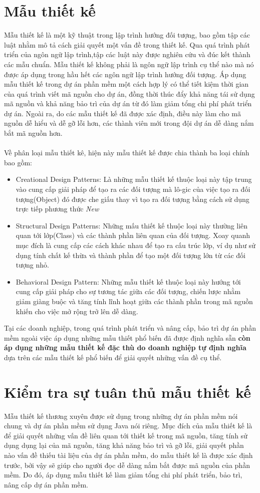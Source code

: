 \documentclass[12pt]{report}
\begin{document}
\section{Mẫu thiết kế}
Mẫu thiết kế là một kỹ thuật trong lập trình hướng đối tượng, bao gồm tập các luật nhằm mô tả cách giải quyết một vấn đề trong thiết kế. Qua quá trình phát triển của ngôn ngữ lập trình,tập các luật này được nghiên cứu và đúc kết thành các mẫu chuẩn. Mẫu thiết kế không phải là ngôn ngữ lập trình cụ thể nào mà nó được áp dụng trong hầu hết các ngôn ngữ lập trình hướng đối tượng.
Áp dụng mẫu thiết kế trong dự án phần mềm một cách hợp lý có thể tiết kiệm thời gian của quá trình viết mã nguồn cho dự án, đồng thời thúc đẩy khả năng tái sử dụng mã nguồn và khả năng bảo trì của dự án từ đó làm giảm tổng chi phí phát triển dự án. Ngoài ra, do các mẫu thiết kế đã được xác định, điều này làm cho mã nguồn dễ hiểu và dễ gỡ lỗi hơn, các thành viên mới trong đội dự án dễ dàng nắm bắt mã nguồn hơn.
 \\\\
Về phân loại mẫu thiết kê, hiện này mẫu thiết kế được chia thành ba loại chính bao gồm:
\begin{itemize}
	\item Creational Design Patterns: Là những mẫu thiết kế thuộc loại này tập trung vào cung cấp giải pháp để tạo ra các đối tượng mà lô-gic của việc tạo ra đối tượng(Object) đó được che giấu thay vì tạo ra đối tượng bằng cách sử dụng trực tiếp phương thức \textit{New}
	\item Structural Design Patterns: Những mấu thiết kế thuộc loại này thường liên quan tới lớp(Class) và các thành phần liên quan của đối tượng. Xoay quanh mục đích là cung cấp các cách khác nhau để tạo ra cấu trúc lớp, ví dụ như sử dụng tính chất kế thừa và thành phần để tạo một đối tượng lớn từ các đối tượng nhỏ.
	\item Behavioral Design Pattern: Những mẫu thiết kế thuộc loại này hướng tới cung cấp giải pháp cho sự tương tác giữa các đối tượng, chiến lược nhằm giảm giàng buộc và tăng tính lĩnh hoạt giữa các thành phần trong mã nguồn khiến cho việc mở rộng trở lên dễ dàng.
\end{itemize}
Tại các doanh nghiệp, trong quá trình phát triển và nâng cấp, bảo trì dự án phần mềm ngoài việc áp dụng những mẫu thiết phổ biến đã được định nghĩa sẵn \textbf{còn áp dụng những mẫu thiết kế đặc thù do doanh nghiệp tự định nghĩa } dựa trên các mẫu thiết kế phổ biến để giải quyết những vấn đề cụ thể.
\section{Kiểm tra sự tuân thủ mẫu thiết kế}
Mẫu thiết kế thương xuyên được sử dụng trong những dự án phần mềm nói chung và dự án phần mềm sử dụng Java nói riêng. Mục đích của mẫu thiết kế là để giải quyết những vấn đề liên quan tới thiết kế trong mã nguồn, tăng tính sử dụng dụng lại của mã nguồn, tăng khả năng bảo trì và gỡ lỗi, giải quyết phần nào vấn đề thiếu tài liệu của dự án phần mềm, do mẫu thiết kế là được xác định trước, bởi vậy sẽ giúp cho người đọc dễ dàng nắm bắt được mã nguồn của phần mềm. Do đó, áp dụng mẫu thiết kế làm giảm tổng chi phí phát triển, bảo trì, nâng cấp dự án phần mềm.
\end{document}
